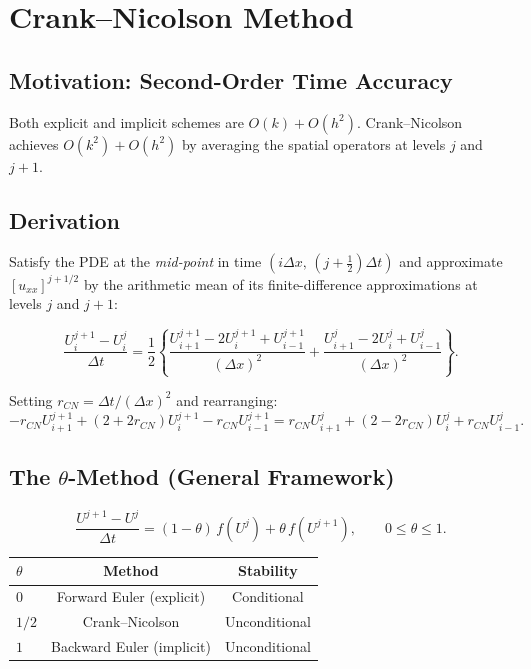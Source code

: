 \documentclass[12pt,a4paper]{article}
\theoremstyle{plain}
\theoremstyle{definition}
\theoremstyle{remark}
\newcommand{\dt}{\Delta t}
\newcommand{\dx}{\Delta x}
\newcommand{\OO}[1]{O\!\left(#1\right)}
\begin{document}
\section{Crank--Nicolson Method}

\subsection{Motivation: Second-Order Time Accuracy}

Both explicit and implicit schemes are $\OO{k}+\OO{h^{2}}$.
Crank--Nicolson achieves $\OO{k^{2}}+\OO{h^{2}}$ by averaging the
spatial operators at levels $j$ and $j+1$.

\subsection{Derivation}

Satisfy the PDE at the \emph{mid-point} in time
$(i\dx,\,(j+\tfrac{1}{2})\dt)$ and approximate $[u_{xx}]^{j+1/2}$
by the arithmetic mean of its finite-difference approximations at
levels $j$ and $j+1$:

\[
  \frac{U_{i}^{j+1}-U_{i}^{j}}{\dt}
  =\frac{1}{2}\!\left\{
    \frac{U_{i+1}^{j+1}-2U_{i}^{j+1}+U_{i-1}^{j+1}}{(\dx)^{2}}
   +\frac{U_{i+1}^{j}-2U_{i}^{j}+U_{i-1}^{j}}{(\dx)^{2}}
  \right\}.
\]

Setting $r_{CN}=\dt/(\dx)^{2}$ and rearranging:
\begin{equation}\label{eq:CN}
  -r_{CN}U_{i+1}^{j+1}+(2+2r_{CN})U_{i}^{j+1}-r_{CN}U_{i-1}^{j+1}
  =r_{CN}U_{i+1}^{j}+(2-2r_{CN})U_{i}^{j}+r_{CN}U_{i-1}^{j}.
\end{equation}

\subsection{The $\theta$-Method (General Framework)}

\begin{keybox}
\begin{equation}\label{eq:theta}
  \frac{U^{j+1}-U^{j}}{\dt}=(1-\theta)\,f(U^{j})+\theta\,f(U^{j+1}),
  \qquad 0\leq\theta\leq1.
\end{equation}
\begin{center}
\renewcommand{\arraystretch}{1.3}
\begin{tabular}{lcc}
  \toprule
  $\theta$ & Method & Stability \\
  \midrule
  $0$   & Forward Euler (explicit) & Conditional \\
  $1/2$ & Crank--Nicolson          & Unconditional \\
  $1$   & Backward Euler (implicit)& Unconditional \\
  \bottomrule
\end{tabular}
\end{center}
\end{keybox}
\end{document}
